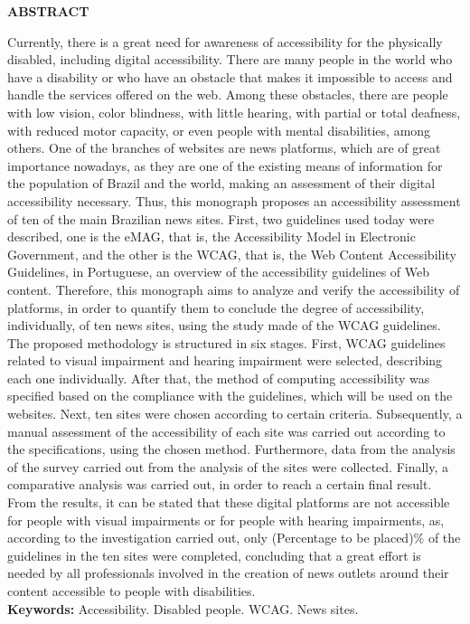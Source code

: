 \documentclass[a4paper]{article}
\begin{document}
\begin{titlepage}
	\begin{center}
		{\large \textbf{ABSTRACT}}\\[1cm]
	\end{center}
	\fontsize{12pt}{0pt}\selectfont
	\onehalfspacing
	Currently, there is a great need for awareness of accessibility for the physically disabled, including digital accessibility. There are many people in the world who have a disability or who have an obstacle that makes it impossible to access and handle the services offered on the web. Among these obstacles, there are people with low vision, color blindness, with little hearing, with partial or total deafness, with reduced motor capacity, or even people with mental disabilities, among others. One of the branches of websites are news platforms, which are of great importance nowadays, as they are one of the existing means of information for the population of Brazil and the world, making an assessment of their digital accessibility necessary. Thus, this monograph proposes an accessibility assessment of ten of the main Brazilian news sites. First, two guidelines used today were described, one is the eMAG, that is, the Accessibility Model in Electronic Government, and the other is the WCAG, that is, the Web Content Accessibility Guidelines, in Portuguese, an overview of the accessibility guidelines of Web content. Therefore, this monograph aims to analyze and verify the accessibility of platforms, in order to quantify them to conclude the degree of accessibility, individually, of ten news sites, using the study made of the WCAG guidelines. The proposed methodology is structured in six stages. First, WCAG guidelines related to visual impairment and hearing impairment were selected, describing each one individually. After that, the method of computing accessibility was specified based on the compliance with the guidelines, which will be used on the websites. Next, ten sites were chosen according to certain criteria. Subsequently, a manual assessment of the accessibility of each site was carried out according to the specifications, using the chosen method. Furthermore, data from the analysis of the survey carried out from the analysis of the sites were collected. Finally, a comparative analysis was carried out, in order to reach a certain final result. From the results, it can be stated that these digital platforms are not accessible for people with visual impairments or for people with hearing impairments, as, according to the investigation carried out, only (Percentage to be placed)\% of the guidelines in the ten sites were completed, concluding that a great effort is needed by all professionals involved in the creation of news outlets around their content accessible to people with disabilities.\\[1cm]
	{\large \textbf{Keywords: }}Accessibility. Disabled people. WCAG. News sites.\\[1cm]
\end{titlepage}
\end{document}
